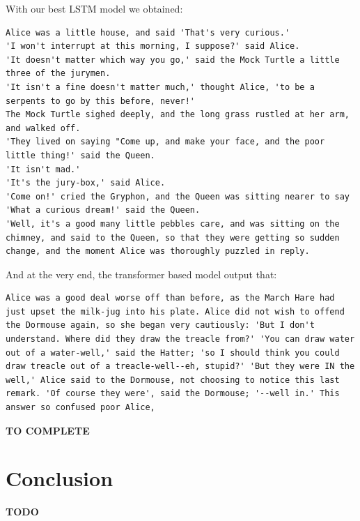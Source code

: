 \documentclass{article}
\begin{document}
With our best LSTM model we obtained: 
\begin{lstlisting}[breaklines]
Alice was a little house, and said 'That's very curious.'
'I won't interrupt at this morning, I suppose?' said Alice.
'It doesn't matter which way you go,' said the Mock Turtle a little three of the jurymen.
'It isn't a fine doesn't matter much,' thought Alice, 'to be a serpents to go by this before, never!'
The Mock Turtle sighed deeply, and the long grass rustled at her arm, and walked off.
'They lived on saying "Come up, and make your face, and the poor little thing!' said the Queen.
'It isn't mad.'
'It's the jury-box,' said Alice.
'Come on!' cried the Gryphon, and the Queen was sitting nearer to say 'What a curious dream!' said the Queen.
'Well, it's a good many little pebbles care, and was sitting on the chimney, and said to the Queen, so that they were getting so sudden change, and the moment Alice was thoroughly puzzled in reply.

\end{lstlisting}

And at the very end, the transformer based model output that:
\begin{lstlisting}[breaklines]
Alice was a good deal worse off than before, as the March Hare had just upset the milk-jug into his plate. Alice did not wish to offend the Dormouse again, so she began very cautiously: 'But I don't understand. Where did they draw the treacle from?' 'You can draw water out of a water-well,' said the Hatter; 'so I should think you could draw treacle out of a treacle-well--eh, stupid?' 'But they were IN the well,' Alice said to the Dormouse, not choosing to notice this last remark. 'Of course they were', said the Dormouse; '--well in.' This answer so confused poor Alice,
\end{lstlisting}

\textbf{TO COMPLETE}

\section{Conclusion}

\textbf{TODO}

\newpage



\newpage
\end{document}

